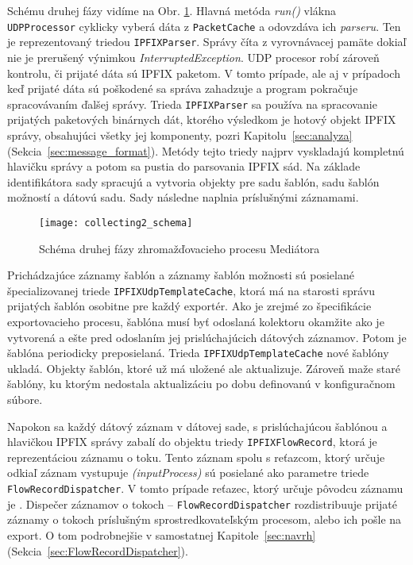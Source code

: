 Schému druhej fázy vidíme na Obr. \ref{o:collecting2_schema}. Hlavná metóda \emph{run()} vlákna 
\verb|UDPProcessor| cyklicky vyberá dáta z \verb|PacketCache| a odovzdáva ich \emph{parseru}. 
Ten je reprezentovaný 
triedou \verb|IPFIXParser|. Správy číta z vyrovnávacej pamäte dokiaľ nie je prerušený výnimkou 
\emph{InterruptedException}.
UDP procesor robí zároveň kontrolu, či prijaté dáta sú IPFIX paketom. V tomto prípade, ale aj v prípadoch
keď prijaté dáta sú poškodené sa správa zahadzuje a program pokračuje spracovávaním ďalšej správy.
Trieda \verb|IPFIXParser| sa používa na spracovanie prijatých paketových binárnych dát, ktorého 
výsledkom je hotový objekt IPFIX správy, obsahujúci všetky jej komponenty, pozri 
Kapitolu~\ref{sec:analyza} (Sekcia~\ref{sec:message_format}). Metódy tejto triedy najprv vyskladajú 
kompletnú hlavičku správy a potom sa pustia do parsovania IPFIX sád. Na základe identifikátora sady 
spracujú a vytvoria objekty pre sadu šablón, sadu šablón možností a dátovú sadu. Sady následne naplnia 
príslušnými záznamami. 

\begin{figure}[ht!]
\centering
\texttt{[image: collecting2\_schema]}
\caption{Schéma druhej fázy zhromažďovacieho procesu Mediátora}\label{o:collecting2_schema}
\end{figure}

Prichádzajúce záznamy šablón a záznamy šablón možnosti sú posielané špecializovanej triede 
\verb|IPFIXUdpTemplateCache|, ktorá má na starosti správu prijatých šablón osobitne pre každý exportér. 
Ako je zrejmé zo špecifikácie exportovacieho procesu, šablóna musí byť odoslaná kolektoru okamžite ako je 
vytvorená a ešte pred odoslaním jej prislúchajúcich dátových záznamov. Potom je šablóna periodicky 
preposielaná. Trieda \verb|IPFIXUdpTemplateCache| nové šablóny ukladá. Objekty šablón, ktoré už má 
uložené ale aktualizuje. Zároveň maže staré šablóny, ku ktorým nedostala aktualizáciu po dobu definovanú v 
konfiguračnom súbore.

Napokon sa každý dátový záznam v dátovej sade, s prislúchajúcou šablónou a hlavičkou IPFIX správy 
zabalí do objektu triedy \verb|IPFIXFlowRecord|, ktorá je reprezentáciou záznamu o toku. 
Tento záznam spolu s reťazcom, ktorý určuje odkiaľ záznam vystupuje \emph{(inputProcess)} sú posielané
ako parametre triede \verb|FlowRecordDispatcher|. V tomto prípade reťazec, ktorý určuje pôvodcu záznamu 
je \emph{}. 
Dispečer záznamov o tokoch -- \verb|FlowRecordDispatcher| rozdistribuuje prijaté záznamy o tokoch 
príslušným sprostredkovateľským procesom, alebo ich pošle na export. O tom podrobnejšie v samostatnej 
Kapitole~\ref{sec:navrh} (Sekcia~\ref{sec:FlowRecordDispatcher}). 

